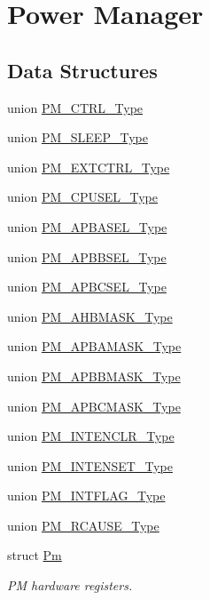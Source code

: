 \hypertarget{group___s_a_m_d21___p_m}{}\section{Power Manager}
\label{group___s_a_m_d21___p_m}
\subsection*{Data Structures}
\begin{DoxyCompactItemize}
\item 
union \mbox{\hyperlink{union_p_m___c_t_r_l___type}{P\+M\+\_\+\+C\+T\+R\+L\+\_\+\+Type}}
\item 
union \mbox{\hyperlink{union_p_m___s_l_e_e_p___type}{P\+M\+\_\+\+S\+L\+E\+E\+P\+\_\+\+Type}}
\item 
union \mbox{\hyperlink{union_p_m___e_x_t_c_t_r_l___type}{P\+M\+\_\+\+E\+X\+T\+C\+T\+R\+L\+\_\+\+Type}}
\item 
union \mbox{\hyperlink{union_p_m___c_p_u_s_e_l___type}{P\+M\+\_\+\+C\+P\+U\+S\+E\+L\+\_\+\+Type}}
\item 
union \mbox{\hyperlink{union_p_m___a_p_b_a_s_e_l___type}{P\+M\+\_\+\+A\+P\+B\+A\+S\+E\+L\+\_\+\+Type}}
\item 
union \mbox{\hyperlink{union_p_m___a_p_b_b_s_e_l___type}{P\+M\+\_\+\+A\+P\+B\+B\+S\+E\+L\+\_\+\+Type}}
\item 
union \mbox{\hyperlink{union_p_m___a_p_b_c_s_e_l___type}{P\+M\+\_\+\+A\+P\+B\+C\+S\+E\+L\+\_\+\+Type}}
\item 
union \mbox{\hyperlink{union_p_m___a_h_b_m_a_s_k___type}{P\+M\+\_\+\+A\+H\+B\+M\+A\+S\+K\+\_\+\+Type}}
\item 
union \mbox{\hyperlink{union_p_m___a_p_b_a_m_a_s_k___type}{P\+M\+\_\+\+A\+P\+B\+A\+M\+A\+S\+K\+\_\+\+Type}}
\item 
union \mbox{\hyperlink{union_p_m___a_p_b_b_m_a_s_k___type}{P\+M\+\_\+\+A\+P\+B\+B\+M\+A\+S\+K\+\_\+\+Type}}
\item 
union \mbox{\hyperlink{union_p_m___a_p_b_c_m_a_s_k___type}{P\+M\+\_\+\+A\+P\+B\+C\+M\+A\+S\+K\+\_\+\+Type}}
\item 
union \mbox{\hyperlink{union_p_m___i_n_t_e_n_c_l_r___type}{P\+M\+\_\+\+I\+N\+T\+E\+N\+C\+L\+R\+\_\+\+Type}}
\item 
union \mbox{\hyperlink{union_p_m___i_n_t_e_n_s_e_t___type}{P\+M\+\_\+\+I\+N\+T\+E\+N\+S\+E\+T\+\_\+\+Type}}
\item 
union \mbox{\hyperlink{union_p_m___i_n_t_f_l_a_g___type}{P\+M\+\_\+\+I\+N\+T\+F\+L\+A\+G\+\_\+\+Type}}
\item 
union \mbox{\hyperlink{union_p_m___r_c_a_u_s_e___type}{P\+M\+\_\+\+R\+C\+A\+U\+S\+E\+\_\+\+Type}}
\item 
struct \mbox{\hyperlink{struct_pm}{Pm}}
\begin{DoxyCompactList}\small\item\em PM hardware registers. \end{DoxyCompactList}\end{DoxyCompactItemize}

